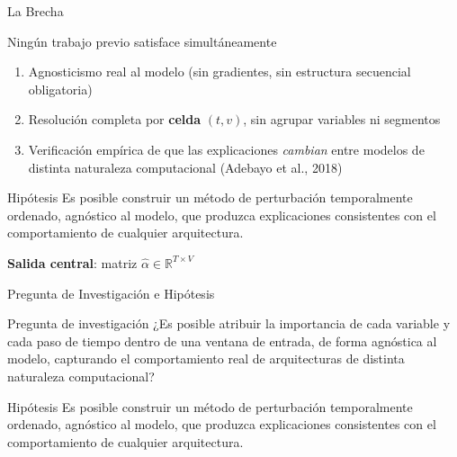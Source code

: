 \documentclass{beamer}
\begin{document}
\begin{frame}{La Brecha}
    \begin{alertblock}{Ningún trabajo previo satisface simultáneamente}
        \begin{enumerate}
            \item Agnosticismo real al modelo (sin gradientes, sin
            estructura secuencial obligatoria)
            \item Resolución completa por \textbf{celda}
            $(t,v)$, sin agrupar variables ni segmentos
            \item Verificación empírica de que las explicaciones
            \emph{cambian} entre modelos de distinta naturaleza
            computacional (Adebayo et al., 2018)
        \end{enumerate}
    \end{alertblock}
    \vspace{0.3cm}
    \begin{block}{Hipótesis}
        Es posible construir un método de perturbación temporalmente
        ordenado, agnóstico al modelo, que produzca explicaciones
        consistentes con el comportamiento de cualquier arquitectura.
    \end{block}
    \begin{center}
        \textbf{Salida central}: matriz
        $\hat{\alpha} \in \mathbb{R}^{T \times V}$
    \end{center}
\end{frame}

\begin{frame}{Pregunta de Investigación e Hipótesis}
    \begin{block}{Pregunta de investigación}
        ¿Es posible atribuir la importancia de cada variable y cada
        paso de tiempo dentro de una ventana de entrada, de forma
        agnóstica al modelo, capturando el comportamiento real de
        arquitecturas de distinta naturaleza computacional?
    \end{block}
    \vspace{0.3cm}
    \begin{alertblock}{Hipótesis}
        Es posible construir un método de perturbación temporalmente
        ordenado, agnóstico al modelo, que produzca explicaciones
        consistentes con el comportamiento de cualquier arquitectura.
    \end{alertblock}
\end{frame}
\end{document}
